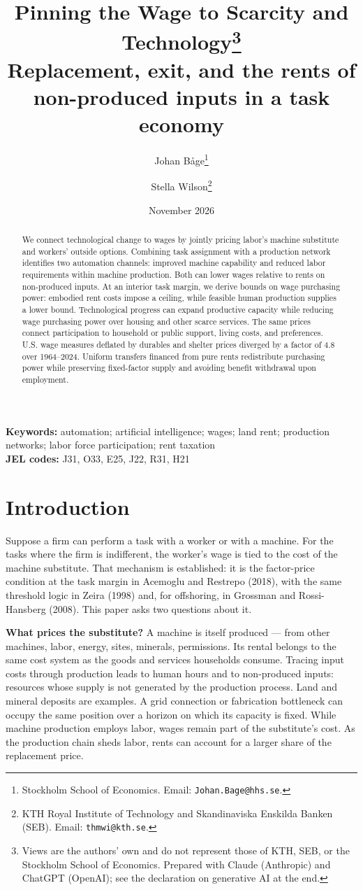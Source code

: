 \documentclass[12pt]{article}
\title{\bfseries Pinning the Wage to Scarcity and Technology\thanks{Views are the
  authors' own and do not represent those of KTH, SEB, or the Stockholm School of
  Economics. Prepared with Claude (Anthropic) and ChatGPT (OpenAI); see the
  declaration on generative AI at the end.
  }\\[7pt]
  \large\mdseries Replacement, exit, and the rents of non-produced inputs in a task economy}
\author{
  Johan B\r{a}ge\thanks{Stockholm School of Economics.
    Email: \texttt{Johan.Bage@hhs.se}.
  }
  \and
  Stella Wilson\thanks{KTH Royal Institute of Technology and Skandinaviska
    Enskilda Banken (SEB). Email: \texttt{thmwi@kth.se}.}
}
\date{November 2026}
\theoremstyle{plain}
\begin{document}
\maketitle

\begin{abstract}
\noindent We connect technological change to wages by jointly pricing labor's machine substitute and workers' outside options. Combining task assignment with a production network identifies two automation channels: improved machine capability and reduced labor requirements within machine production. Both can lower wages relative to rents on non-produced inputs. At an interior task margin, we derive bounds on wage purchasing power: embodied rent costs impose a ceiling, while feasible human production supplies a lower bound. Technological progress can expand productive capacity while reducing wage purchasing power over housing and other scarce services. The same prices connect participation to household or public support, living costs, and preferences. U.S. wage measures deflated by durables and shelter prices diverged by a factor of 4.8 over 1964--2024. Uniform transfers financed from pure rents redistribute purchasing power while preserving fixed-factor supply and avoiding benefit withdrawal upon employment.
\end{abstract}

\noindent\textbf{Keywords:} automation; artificial intelligence; wages; land rent; production networks; labor force participation; rent taxation\\
\textbf{JEL codes:} J31, O33, E25, J22, R31, H21

\section{Introduction}\label{sec:1}

Suppose a firm can perform a task with a worker or with a machine. For the tasks where the firm is indifferent, the worker's wage is tied to the cost of the machine substitute. That mechanism is established: it is the factor-price condition at the task margin in Acemoglu and Restrepo (2018), with the same threshold logic in Zeira (1998) and, for offshoring, in Grossman and Rossi-Hansberg (2008). This paper asks two questions about it.

\textbf{What prices the substitute?} A machine is itself produced --- from other machines, labor, energy, sites, minerals, permissions. Its rental belongs to the same cost system as the goods and services households consume. Tracing input costs through production leads to human hours and to non-produced inputs: resources whose supply is not generated by the production process. Land and mineral deposits are examples. A grid connection or fabrication bottleneck can occupy the same position over a horizon on which its capacity is fixed. While machine production employs labor, wages remain part of the substitute's cost. As the production chain sheds labor, rents can account for a larger share of the replacement price.
\end{document}
